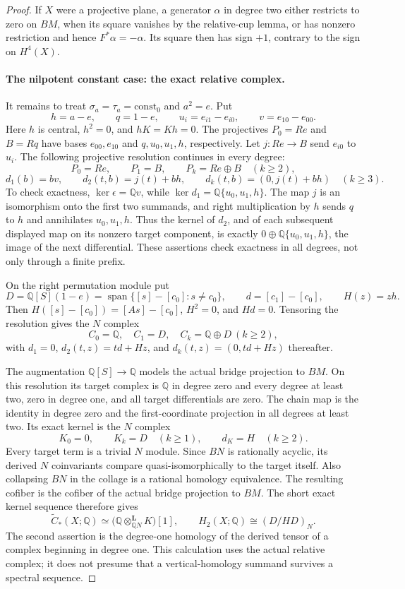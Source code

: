 \begin{proof}
If $X$ were a projective plane, a generator $\alpha$ in
degree two either restricts to zero on $BM$, when its
square vanishes by the relative-cup lemma, or has nonzero
restriction and hence $F^*\alpha=-\alpha$. Its square
then has sign $+1$, contrary to the sign on $H^4(X)$.

\paragraph{The nilpotent constant case: the exact relative complex.}
It remains to treat $\sigma_a=\tau_a=\mathrm{const}_0$
and $a^2=e$. Put
\[
 h=a-e,\qquad q=1-e,\qquad
 u_i=e_{i1}-e_{i0},\qquad v=e_{10}-e_{00}.
\]
Here $h$ is central, $h^2=0$, and $hK=Kh=0$.
The projectives $P_0=Re$ and $B=Rq$ have bases
$e_{00},e_{10}$ and $q,u_0,u_1,h$, respectively.
Let $j:Re\to B$ send $e_{i0}$ to $u_i$.
The following projective resolution continues in every
degree:
\[
 P_0=Re,\qquad P_1=B,\qquad P_k=Re\oplus B\quad(k\ge2),
\]
\[
 d_1(b)=bv,\qquad
 d_2(t,b)=j(t)+bh,\qquad
 d_k(t,b)=(0,j(t)+bh)\quad(k\ge3).
\]
To check exactness, $\ker\epsilon=\mathbb Qv$, while
$\ker d_1=\mathbb Q\{u_0,u_1,h\}$.
The map $j$ is an isomorphism onto the first two summands,
and right multiplication by $h$ sends $q$ to $h$ and
annihilates $u_0,u_1,h$. Thus the kernel of $d_2$, and
of each subsequent displayed map on its nonzero target
component, is exactly
$0\oplus\mathbb Q\{u_0,u_1,h\}$, the image of the
next differential. These assertions check exactness in
all degrees, not only through a finite prefix.

On the right permutation module put
\[
 D=\mathbb Q[S](1-e)
   =\operatorname{span}\{[s]-[c_0]:s\ne c_0\},
 \qquad d=[c_1]-[c_0],
 \qquad H(z)=zh.
\]
Then $H([s]-[c_0])=[As]-[c_0]$, $H^2=0$, and $Hd=0$.
Tensoring the resolution gives the $N$ complex
\[
 C_0=\mathbb Q,\quad C_1=D,\quad C_k=\mathbb Q\oplus D
 \ (k\ge2),
\]
with $d_1=0$, $d_2(t,z)=td+Hz$, and
$d_k(t,z)=(0,td+Hz)$ thereafter.

The augmentation $\mathbb Q[S]\to\mathbb Q$ models the
actual bridge projection to $BM$. On this resolution its
target complex is $\mathbb Q$ in degree zero and every
degree at least two, zero in degree one, and all target
differentials are zero. The chain map is the identity in
degree zero and the first-coordinate projection in all
degrees at least two. Its exact kernel is the $N$ complex
\[
 K_0=0,\qquad K_k=D\quad(k\ge1),\qquad
 d_K=H\quad(k\ge2).                                      \tag{*}
\]
Every target term is a trivial $N$ module. Since $BN$ is
rationally acyclic, its derived $N$ coinvariants compare
quasi-isomorphically to the target itself. Also collapsing
$BN$ in the collage is a rational homology equivalence.
The resulting cofiber is the cofiber of the actual
bridge projection to $BM$. The short exact kernel sequence
therefore gives
\[
 \widetilde C_*(X;\mathbb Q)\simeq
 \bigl(\mathbb Q\otimes_{\mathbb QN}^{\mathbf L}K\bigr)[1],
 \qquad
 H_2(X;\mathbb Q)\cong(D/HD)_N.                         \tag{**}
\]
The second assertion is the degree-one homology of the
derived tensor of a complex beginning in degree one.
This calculation uses the actual relative complex; it
does not presume that a vertical-homology summand survives
a spectral sequence.


\end{proof}
